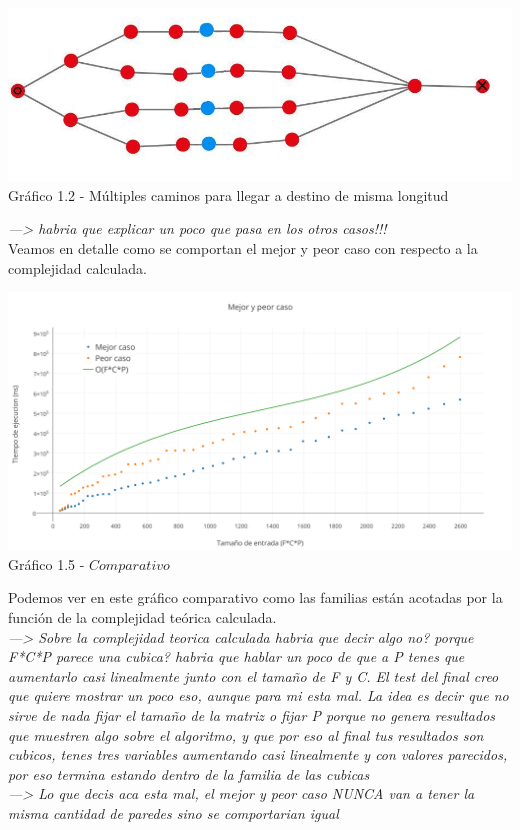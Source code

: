 \vspace*{0.3cm} \vspace*{0.3cm}
  \begin{center}
\includegraphics[scale=0.7]{./EJ1/ej1grafopeorcaso.jpeg}
{Gr\'afico 1.2 - Múltiples caminos para llegar a destino de misma longitud}
  \end{center}
  \vspace*{0.3cm}

\textit{---> habria que explicar un poco que pasa en los otros casos!!!}\\

Veamos en detalle como se comportan el mejor y peor caso con respecto a la complejidad calculada.\\

  \vspace*{0.3cm} \vspace*{0.3cm}
  \begin{center}
\includegraphics[scale=0.5]{./EJ1/MejorYPeorCaso.png}
{Gr\'afico 1.5 - $Comparativo$}
  \end{center}
  \vspace*{0.3cm}
  
Podemos ver en este gr\'afico comparativo como las familias est\'an acotadas por la funci\'on de la complejidad te\'orica calculada.\\

\textit{---> Sobre la complejidad teorica calculada habria que decir algo no? porque F*C*P parece una cubica? habria que hablar un poco de que a P tenes que aumentarlo casi linealmente junto con el tamaño de F y C. El test del final creo que quiere mostrar un poco eso, aunque para mi esta mal. La idea es decir que no sirve de nada fijar el tamaño de la matriz o fijar P porque no genera resultados que muestren algo sobre el algoritmo, y que por eso al final tus resultados son cubicos, tenes tres variables aumentando casi linealmente y con valores parecidos, por eso termina estando dentro de la familia de las cubicas}\\
\textit{---> Lo que decis aca esta mal, el mejor y peor caso NUNCA van a tener la misma cantidad de paredes sino se comportarian igual}

